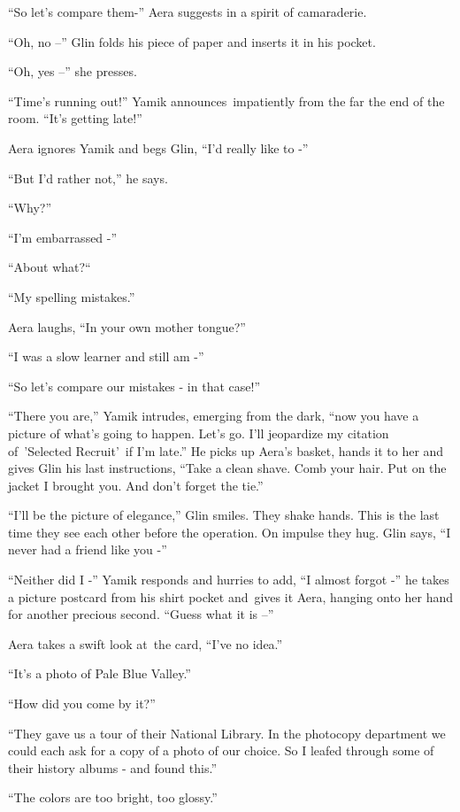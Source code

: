 \documentclass[twoside,11pt]{book}
\begin{document}
``So let's compare them-'' Aera suggests in a spirit of camaraderie.

``Oh, no --'' Glin folds his piece of paper and inserts it in his pocket.\ 

``Oh, yes --'' she presses.

``Time's running out!'' Yamik announces~impatiently from the far the end of the room.
``It's getting late!''

Aera ignores Yamik and begs Glin, ``I'd really like to -'' 

``But I'd rather not,'' he says. 

``Why?'' 

``I'm embarrassed -'' 

``About what?``~ 

``My spelling mistakes.'' 

Aera laughs, ``In your own mother tongue?'' 

``I was a slow learner and still am -'' 

``So let's compare our mistakes - in that case!'' 

{}``There you are,'' Yamik intrudes, emerging from the dark, ``now you have a picture of
what's going to happen. Let's go. I'll jeopardize my citation of\ {}'Selected Recruit{}'\ if I'm late.''
He picks up Aera's basket, hands it to her and gives Glin his last instructions, ``Take a clean shave.
Comb your hair. Put on the jacket I brought you. And don't forget the tie.'' 

``I'll be the picture of elegance,'' Glin smiles. They shake hands. This is the last time they
see each other before the operation. On impulse they hug. Glin says, ``I never had a friend like you
-'' 

``Neither did I -'' Yamik responds and hurries to add, ``I almost forgot
-'' he takes a picture postcard from his shirt pocket and~gives it Aera, hanging onto her hand for another
precious second. ``Guess what it is --'' 

Aera takes a swift look at{\ }the card, ``I've no idea.'' 

``It's a photo of Pale Blue Valley.'' 

``How did you come by it?'' \ 

``They gave us a tour of their National Library. In the photocopy department we could each ask for a copy
of a photo of our choice. So I leafed through some of their history albums - and found this.'' 

``The colors are too bright, too glossy.'' 
\end{document}
